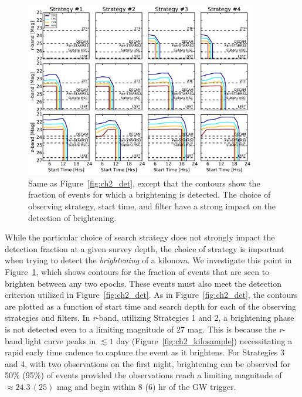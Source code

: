 \begin{figure}[t!]
\centering
\includegraphics[width=0.9\textwidth]{./figs/chapter2/ch2_f5.pdf}
\caption{Same as Figure~\ref{fig:ch2_det}, except that the contours show the fraction of events for which a brightening is detected. The choice of observing strategy, start time, and filter have a strong impact on the detection of brightening.}
\label{fig:ch2_rise}
\end{figure}

While the particular choice of search strategy does not strongly impact the detection fraction at a given survey depth, the choice of strategy is important when trying to detect the {\em brightening} of a kilonova. We investigate this point in Figure~\ref{fig:ch2_rise}, which shows contours for the fraction of events that are seen to brighten between any two epochs. These events must also meet the detection criterion utilized in Figure~\ref{fig:ch2_det}. As in Figure~\ref{fig:ch2_det}, the contours are plotted as a function of start time and search depth for each of the observing strategies and filters. In {\em r}-band, utilizing Strategies 1 and 2, a brightening phase is not detected even to a limiting magnitude of 27 mag. This is because the {\em r}-band light curve peaks in $\lesssim 1$ day (Figure~\ref{fig:ch2_kilosample}) necessitating a rapid early time cadence to capture the event as it brightens. For Strategies 3 and 4, with two observations on the first night, brightening can be observed for 50\% (95\%) of events provided the observations reach a limiting magnitude of $\approx24.3\,(25)$ mag and begin within 8 (6) hr of the GW trigger.

